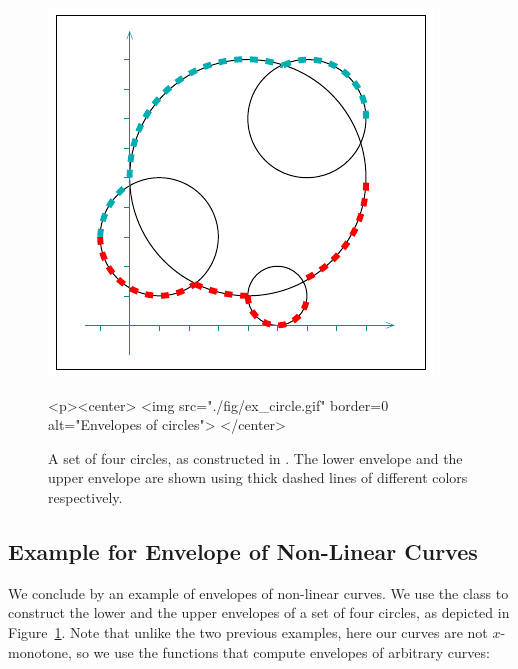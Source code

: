 \begin{figure}[t]
\begin{ccTexOnly}
  \begin{center}
    \includegraphics{Envelope_2/fig/ex_circle}
  \end{center}
\end{ccTexOnly}
\begin{ccHtmlOnly}
  <p><center>
  <img src="./fig/ex_circle.gif" border=0 alt="Envelopes of circles">
  </center>
\end{ccHtmlOnly}
\caption{A set of four circles, as constructed in
. The lower envelope and the upper
envelope are shown using thick dashed lines of different colors
respectively.\label{env2_fig:ex_circ}}
\end{figure}

\subsection{Example for Envelope of Non-Linear Curves}

We conclude by an example of envelopes of non-linear curves. 
We use the  class to construct the
lower and the upper envelopes of a set of four circles, as depicted
in Figure~\ref{env2_fig:ex_circ}. Note that unlike the two previous
examples, here our curves are not $x$-monotone, so we use the functions
that compute envelopes of arbitrary curves:

